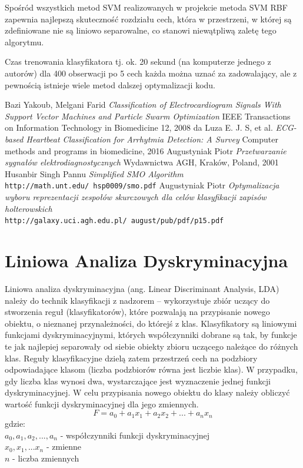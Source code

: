 \documentclass[[10pt,a4paper]{article}
\begin{document}
Spośród wszystkich metod SVM realizowanych w projekcie metoda SVM RBF zapewnia najlepszą skuteczność rozdziału cech, która w przestrzeni, w której są zdefiniowane nie są liniowo separowalne, co stanowi niewątpliwą zaletę tego algorytmu. \cite{melgani}

Czas trenowania klasyfikatora tj. ok. 20 sekund (na komputerze jednego z autorów) dla 400 obserwacji po 5 cech każda można uznać za zadowalający, ale z pewnością istnieje wiele metod dalszej optymalizacji kodu.

\begin{thebibliography}{9}
	
	Bazi Yakoub, Melgani Farid
	\textit{Classification of Electrocardiogram Signals With Support Vector Machines and Particle Swarm Optimization} 
	IEEE Transactions on Information Technology in Biomedicine 12, 2008
	da Luza E. J. S, et al.
	\textit{ECG-based Heartbeat Classification for Arrhytmia Detection: A Survey} 
	Computer methods and programs in biomedicine, 2016
	Augustyniak Piotr
	\textit{Przetwarzanie sygnałów elektrodiagnostycznych} 
	Wydawnictwa AGH, Kraków, Poland, 2001
	Husanbir Singh Pannu
	\textit{Simplified SMO Algorithm} 
	\\\texttt{http://math.unt.edu/~hsp0009/smo.pdf}
	Augustyniak Piotr
	\textit{Optymalizacja wyboru reprezentacji zespołów skurczowych dla celów klasyfikacji zapisów holterowskich} 
	\\\texttt{http://galaxy.uci.agh.edu.pl/~august/pub/pdf/p15.pdf}
	
\end{thebibliography}
\newpage


\section{Liniowa Analiza Dyskryminacyjna}

 Liniowa analiza dyskryminacyjna (ang. Linear Discriminant Analysis, LDA) należy do technik klasyfikacji z nadzorem – wykorzystuje zbiór uczący do stworzenia reguł (klasyfikatorów), które pozwalają na przypisanie nowego obiektu, o nieznanej przynależności, do którejś z klas. Klasyfikatory są liniowymi funkcjami dyskryminacyjnymi, których współczynniki dobrane są tak, by funkcje te jak najlepiej separowały od siebie obiekty zbioru uczącego należące do różnych klas. Reguły klasyfikacyjne dzielą zatem przestrzeń cech na podzbiory odpowiadające klasom (liczba podzbiorów równa jest liczbie klas). W przypadku, gdy liczba klas wynosi dwa, wystarczające jest wyznaczenie jednej funkcji dyskryminacyjnej. W celu przypisania nowego obiektu do klasy należy obliczyć wartość funkcji dyskryminacyjnej dla jego zmiennych. 
\begin{equation}
 F = a_0 + a_1x_1 + a_2x_2 + ... + a_nx_n
 \end{equation}
 gdzie:\\
  \(a_0, a_1, a_2, ...,a_n\) - współczynniki funkcji dyskryminacyjnej\\ \(x_0, x_1, ...x_n\) - zmienne\\ \(n\) - liczba zmiennych\\
  
\end{document}
